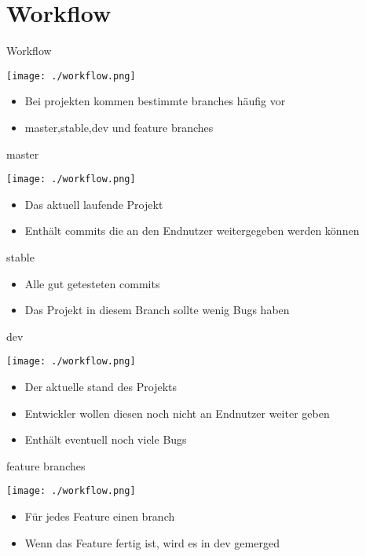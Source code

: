 \documentclass[presentation, smaller]{beamer}
\begin{document}
\section{Workflow}
\label{sec:orge2abcf8}
\begin{frame}[label={sec:org54e1806}]{Workflow}
\begin{center}
\texttt{[image: ./workflow.png]}
\end{center}
\begin{itemize}
\item Bei projekten kommen bestimmte branches häufig vor
\item master,stable,dev und feature branches
\end{itemize}
\end{frame}
\begin{frame}[label={sec:org3bb1150}]{master}
\begin{center}
\texttt{[image: ./workflow.png]}
\end{center}
\begin{itemize}
\item Das aktuell laufende Projekt
\item Enthält commits die an den Endnutzer weitergegeben werden können
\end{itemize}
\end{frame}
\begin{frame}[label={sec:orga5fc929}]{stable}
\begin{itemize}
\item Alle gut getesteten commits
\item Das Projekt in diesem Branch sollte wenig Bugs haben
\end{itemize}
\end{frame}
\begin{frame}[label={sec:orge20f883}]{dev}
\begin{center}
\texttt{[image: ./workflow.png]}
\end{center}
\begin{itemize}
\item Der aktuelle stand des Projekts
\item Entwickler wollen diesen noch nicht an Endnutzer weiter geben
\item Enthält eventuell noch viele Bugs
\end{itemize}
\end{frame}
\begin{frame}[label={sec:org3bb214a}]{feature branches}
\begin{center}
\texttt{[image: ./workflow.png]}
\end{center}
\begin{itemize}
\item Für jedes Feature einen branch
\item Wenn das Feature fertig ist, wird es in dev gemerged
\end{itemize}
\end{frame}
\end{document}
